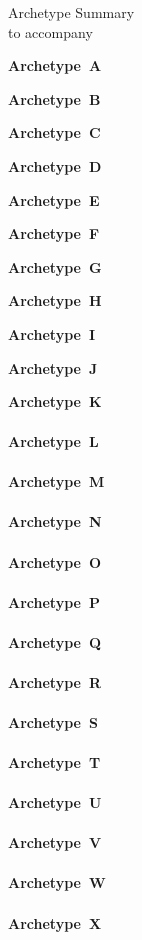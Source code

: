 \documentclass[12pt]{article}
\newlength{\summaryskip}
\newcommand*{\archetypesummary}[2]
{
{\bf Archetype\ #1}\nopagebreak[4]

\par\vspace{\summaryskip}
}
\newcommand*{\archetypesummarymath}[2]
{
{\bf Archetype\ #1}\nopagebreak[4]
\begin{align*}

\end{align*}
\par\vspace{\summaryskip}
}
\begin{document}
%
%
\begin{titlepage}
\begin{center}
{\fontsize{24}{24}\selectfont  Archetype Summary}\\[12pt]
{\large to accompany}

\end{center}
\end{titlepage}

\clearpage
%
%
\newpage
%
\archetypesummary{A}{definition}
\archetypesummary{B}{definition}
\archetypesummary{C}{definition}
\archetypesummary{D}{definition}
\archetypesummary{E}{definition}
\archetypesummary{F}{definition}
\archetypesummary{G}{definition}
\archetypesummary{H}{definition}
\archetypesummary{I}{definition}
\archetypesummary{J}{definition}
\archetypesummarymath{K}{purematrix}
\archetypesummarymath{L}{purematrix}
\archetypesummarymath{M}{ltdefn}
\archetypesummarymath{N}{ltdefn}
\archetypesummarymath{O}{ltdefn}
\archetypesummarymath{P}{ltdefn}
\archetypesummarymath{Q}{ltdefn}
\archetypesummarymath{R}{ltdefn}
\archetypesummarymath{S}{ltdefn}
\archetypesummarymath{T}{ltdefn}
\archetypesummarymath{U}{ltdefn}
\archetypesummarymath{V}{ltdefn}
\archetypesummarymath{W}{ltdefn}
\archetypesummarymath{X}{ltdefn}
\end{document}
